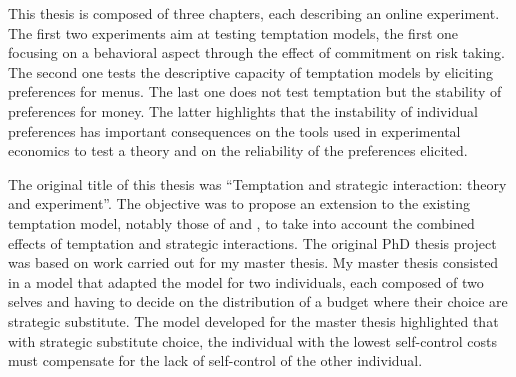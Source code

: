 \documentclass[
]{book}
\begin{document}
This thesis is composed of three chapters, each describing an online experiment.
The first two experiments aim at testing temptation models, the first one
focusing on a behavioral aspect through the effect of commitment on risk taking.
The second one tests the descriptive capacity of temptation models by eliciting
preferences for menus.
The last one does not test temptation but the stability of preferences for money.
The latter highlights that the instability of individual preferences has
important consequences on the tools used in experimental economics to test a
theory and on the reliability of the preferences elicited.

The original title of this thesis was ``Temptation and strategic interaction:
theory and experiment''.
The objective was to propose an extension to the existing temptation model,
notably those of \citet{gul2001temptation} and \citet{fudenberg2006dual}, to take into account the combined effects of temptation and strategic interactions.
The original PhD thesis project was based on work carried out for my master thesis.
My master thesis consisted in a model that adapted the \citet{fudenberg2006dual} model for two individuals, each composed of two selves and having to decide on the distribution of a budget where their choice
are strategic substitute.
The model developed for the master thesis highlighted that with strategic substitute choice, the
individual with the lowest self-control costs must compensate for the lack of
self-control of the other individual.
\end{document}

